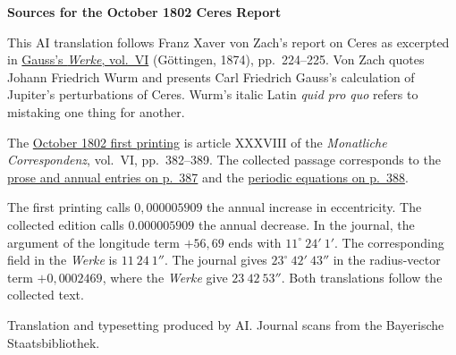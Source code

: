 \clearpage\thispagestyle{empty}
\begin{center}\textbf{Sources for the October 1802 Ceres Report}\end{center}
\noindent This AI translation follows Franz Xaver von Zach’s report on Ceres as excerpted in \href{https://gdz.sub.uni-goettingen.de/id/PPN236007467}{Gauss’s \textit{Werke}, vol.~VI} (Göttingen, 1874), pp.~224--225. Von Zach quotes Johann Friedrich Wurm and presents Carl Friedrich Gauss’s calculation of Jupiter’s perturbations of Ceres. Wurm’s italic Latin \textit{quid pro quo} refers to mistaking one thing for another.
\par\smallskip\noindent The \href{https://api.digitale-sammlungen.de/iiif/image/v2/bsb10538598_00392/full/1450,/0/default.jpg}{October 1802 first printing} is article XXXVIII of the \textit{Monatliche Correspondenz}, vol.~VI, pp.~382--389. The collected passage corresponds to the \href{https://api.digitale-sammlungen.de/iiif/image/v2/bsb10538598_00397/full/1450,/0/default.jpg}{prose and annual entries on p.~387} and the \href{https://api.digitale-sammlungen.de/iiif/image/v2/bsb10538598_00398/full/1450,/0/default.jpg}{periodic equations on p.~388}.
\par\smallskip\noindent The first printing calls \(0{,}000005909\) the annual increase in eccentricity. The collected edition calls \(0.000005909\) the annual decrease. In the journal, the argument of the longitude term \(+56{,}69\) ends with \(11^\circ\ 24'\ 1'\). The corresponding field in the \textit{Werke} is \(11\ 24\ 1''\). The journal gives \(23^\circ\ 42'\ 43''\) in the radius-vector term \(+0{,}0002469\), where the \textit{Werke} give \(23\ 42\ 53''\). Both translations follow the collected text.
\par\smallskip\noindent Translation and typesetting produced by AI. Journal scans from the Bayerische Staatsbibliothek.
\clearpage
